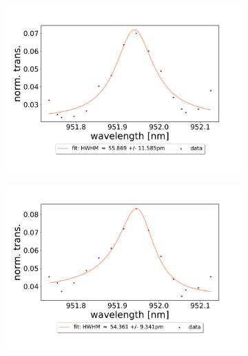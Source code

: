 \begin{figure}[h!]
    \centering
    \begin{subfigure}[b]{0.49\textwidth}
        \includegraphics[width=\textwidth]{figures/results/double fano fits/20250326/53um_M3:M5_fit_1.pdf}
        \caption{}
        \label{fig:53um_M3:M5_fit_1}
    \end{subfigure}
        \begin{subfigure}[b]{0.49\textwidth}
        \includegraphics[width=\textwidth]{figures/results/double fano fits/20250326/53um_M3:M5_fit_2.pdf}
        \caption{}
        \label{fig:53um_M3:M5_fit_2}
    \end{subfigure}
    \begin{subfigure}[b]{0.49\textwidth}

\end{subfigure}
\end{figure}
